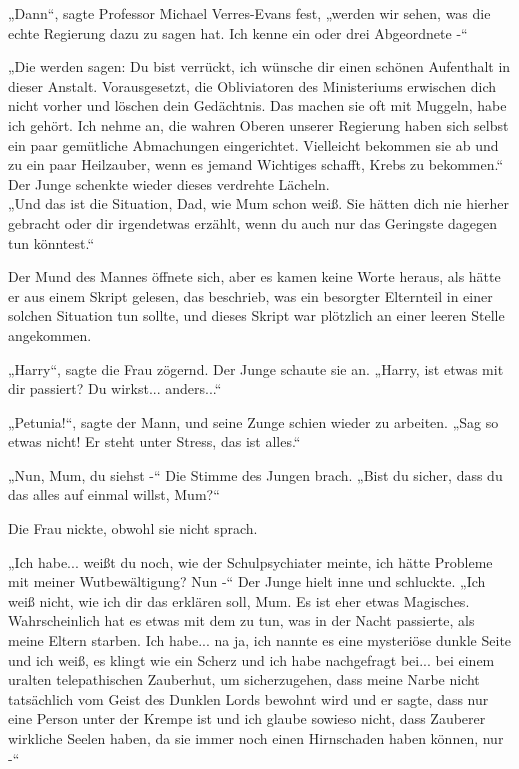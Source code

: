 {„Dann“, sagte Professor Michael Verres-Evans fest, „werden wir sehen, was die echte Regierung dazu zu sagen hat. Ich kenne ein oder drei Abgeordnete -“

„Die werden sagen: Du bist verrückt, ich wünsche dir einen schönen Aufenthalt in dieser Anstalt. Vorausgesetzt, die Obliviatoren des Ministeriums erwischen dich nicht vorher und löschen dein Gedächtnis. Das machen sie oft mit Muggeln, habe ich gehört. Ich nehme an, die wahren Oberen unserer Regierung haben sich selbst ein paar gemütliche Abmachungen eingerichtet. Vielleicht bekommen sie ab und zu ein paar Heilzauber, wenn es jemand Wichtiges schafft, Krebs zu bekommen.“\\ Der Junge schenkte wieder dieses verdrehte Lächeln.\\ „Und das ist die Situation, Dad, wie Mum schon weiß. Sie hätten dich nie hierher gebracht oder dir irgendetwas erzählt, wenn du auch nur das Geringste dagegen tun könntest.“

Der Mund des Mannes öffnete sich, aber es kamen keine Worte heraus, als hätte er aus einem Skript gelesen, das beschrieb, was ein besorgter Elternteil in einer solchen Situation tun sollte, und dieses Skript war plötzlich an einer leeren Stelle angekommen.

„Harry“, sagte die Frau zögernd. Der Junge schaute sie an. „Harry, ist etwas mit dir passiert? Du wirkst... anders...“

„Petunia!“, sagte der Mann, und seine Zunge schien wieder zu arbeiten. „Sag so etwas nicht! Er steht unter Stress, das ist alles.“

„Nun, Mum, du siehst -“ Die Stimme des Jungen brach. „Bist du sicher, dass du das alles auf einmal willst, Mum?“

Die Frau nickte, obwohl sie nicht sprach.

„Ich habe... weißt du noch, wie der Schulpsychiater meinte, ich hätte Probleme mit meiner Wutbewältigung? Nun -“ Der Junge hielt inne und schluckte. „Ich weiß nicht, wie ich dir das erklären soll, Mum. Es ist eher etwas Magisches. Wahrscheinlich hat es etwas mit dem zu tun, was in der Nacht passierte, als meine Eltern starben. Ich habe... na ja, ich nannte es eine mysteriöse dunkle Seite und ich weiß, es klingt wie ein Scherz und ich habe nachgefragt bei... bei einem uralten telepathischen Zauberhut, um sicherzugehen, dass meine Narbe nicht tatsächlich vom Geist des Dunklen Lords bewohnt wird und er sagte, dass nur eine Person unter der Krempe ist und ich glaube sowieso nicht, dass Zauberer wirkliche Seelen haben, da sie immer noch einen Hirnschaden haben können, nur -“

}
